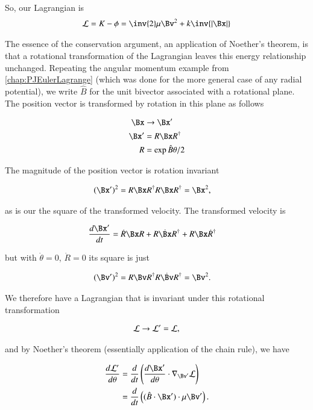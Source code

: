So, our Lagrangian is
\begin{align*}
\LL = K - \phi = \inv{2} \mu \Bv^2 + k \inv{\Abs{\Bx}}
\end{align*}

The essence of the conservation argument, an application of 
Noether's theorem,
is that a rotational transformation of the Lagrangian leaves this energy relationship unchanged.  Repeating 
the angular momentum example from \ref{chap:PJEulerLagrange} (which was done for the more general case of any radial potential), we 
write $\hat{B}$ for the unit bivector associated with a rotational plane.  The position vector is transformed by rotation in this plane as follows

\begin{align*}
\Bx &\rightarrow \Bx' \\
\Bx' &= R \Bx R^\dagger \\
R &= \exp{\hat{B}\theta/2}
\end{align*}

The magnitude of the position vector is rotation invariant

\begin{align*}
(\Bx')^2 &= R \Bx R^\dagger R \Bx R^\dagger = \Bx^2,
\end{align*}

as is our the square of the transformed velocity.  The transformed velocity is

\begin{align*}
\frac{d\Bx'}{dt} &= \dot{R} \Bx R + R \dot{\Bx} R^\dagger + R \Bx \dot{R}^\dagger
\end{align*}

but with $\dot{\theta} = 0$, $\dot{R} = 0$ its square is just

\begin{align*}
(\Bv')^2 &= R {\Bv} R^\dagger R \dot{\Bv} R^\dagger = \Bv^2.
\end{align*}

We therefore have a Lagrangian that is invariant under this rotational transformation

\begin{align*}
\mathcal{L} \rightarrow \mathcal{L}' = \mathcal{L},
\end{align*}

and by Noether's theorem (essentially application of the chain rule), we have

\begin{align*}
\frac{d\LL'}{d\theta}
&= \frac{d}{dt} \left(\frac{d\Bx'}{d\theta} \cdot \grad_{\Bv'} \LL \right) \\
&= \frac{d}{dt} \left( (\hat{B} \cdot \Bx') \cdot \mu \Bv' \right).
\end{align*}

